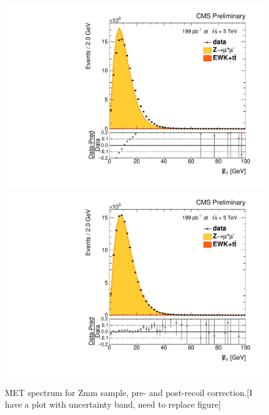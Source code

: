 \begin{figure}
\centering
\includegraphics[width=0.49\linewidth]{plots/Recoil/close_nocorr_13/fitmetp.pdf}
\includegraphics[width=0.49\linewidth]{plots/Recoil/close_corr_13/fitmetp.pdf}
\caption{MET spectrum for Zmm sample, pre- and post-recoil correction.[I have a plot with uncertainty band, need to replace figure]}
\label{fig:recoil:validation:met}
\end{figure}